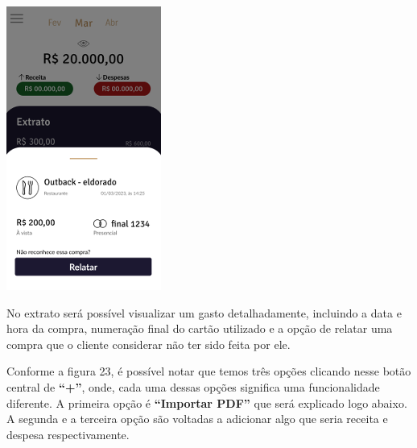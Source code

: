     \vspace{\baselineskip}
    \begin{center}
        \begin{minipage}{\textwidth}
            \centering
            \includegraphics[scale=0.8]{figs/img_455_extrato.png}
            \label{fig:figura22}
        \end{minipage}
    \end{center}  

No extrato será possível visualizar um gasto detalhadamente, incluindo a data e hora da compra, numeração final do cartão utilizado e a opção de relatar uma compra que o cliente considerar não ter sido feita por ele. 

Conforme a figura 23, é possível notar que temos três opções clicando nesse botão central de \textbf{“+”}, onde, cada uma dessas opções significa uma funcionalidade diferente. A primeira opção é \textbf{“Importar PDF”} que será explicado logo abaixo. A segunda e a terceira opção são voltadas a adicionar algo que seria receita e despesa respectivamente. 

